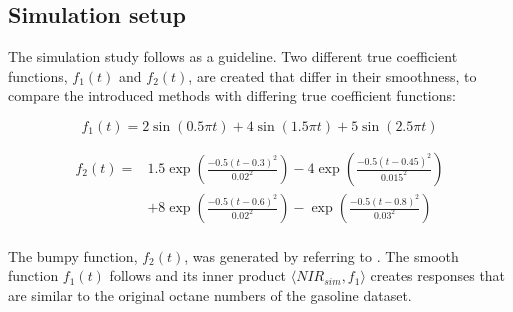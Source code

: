 \documentclass[11pt,twoside,a4paper]{article}
\begin{document}
    \subsection{Simulation setup}
	The simulation study follows \cite{Reiss_2007b} as a guideline. Two different true coefficient functions,  $f_1(t)$ and  $f_2(t)$, are created that differ in their smoothness, to compare the introduced methods with differing true coefficient functions:
	
	\begin{equation}
    	f_1(t) = 2\sin(0.5\pi t) + 4\sin(1.5 \pi t) + 5\sin(2.5 \pi t) 
    \end{equation}

    \begin{equation}
    	\begin{split}
    		f_2(t) = & 1.5 \exp{\left(\frac{-0.5(t-0.3)^2}{0.02^2}\right)} - 4 \exp{\left(\frac{-0.5(t-0.45)^2}{0.015^2}\right)} \\
    				 & + 8 \exp{\left(\frac{-0.5(t-0.6)^2}{0.02^2}\right)} -  \exp{\left(\frac{-0.5(t-0.8)^2}{0.03^2}\right)}
    	\end{split}
    \end{equation}
    \vspace{0.2cm}\\
    
    The bumpy function, $f_2(t)$, was generated by referring to \cite{cardot_bumpyfunction_2002}. The smooth function $f_1(t)$ follows \cite{Reiss_2007b} and its inner product $\langle NIR_{sim}, f_1 \rangle$ creates responses that are similar to the original octane numbers of the gasoline dataset. 
\end{document}
